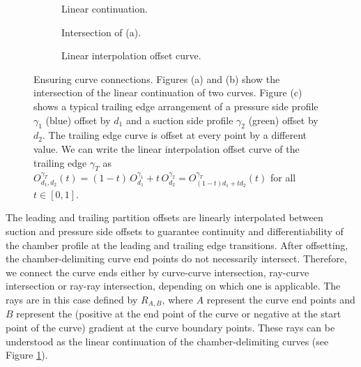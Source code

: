 \documentclass[a4paper, 11pt]{report}
\theoremstyle{definition}
\begin{document}
	\begin{figure}[H]
		\centering
		\begin{subfigure}{0.28\textwidth}
			\centering
			
			\caption{Linear continuation.}
		\end{subfigure}
		\begin{subfigure}{0.28\textwidth}
			\centering
			
			\caption{Intersection of (a).}
		\end{subfigure}
		\begin{subfigure}{0.42\textwidth}
			\centering
			
			\caption{Linear interpolation offset curve.}
		\end{subfigure}
		\caption{Ensuring curve connections. Figures (a) and (b) show the intersection of the linear continuation of two curves. Figure (c) shows a typical trailing edge arrangement of a pressure side profile $\gamma_1$ (blue) offset by $d_1$ and a suction side profile $\gamma_2$ (green) offset by $d_2$. The trailing edge curve is offset at every point by a different value. We can write the linear interpolation offset curve of the trailing edge $\gamma_T$ as $O_{d_1, d_2}^{\gamma_T}(t) = (1-t)\,O_{d_1}^{\gamma_1} + t\,O_{d_2}^{\gamma_2} = O^{\gamma_T}_{(1-t)d_1 + td_2}(t)$ for all $t \in [0,1]$.}
		\label{fig:linear_continuation_curve}
	\end{figure}

	The leading and trailing partition offsets are linearly interpolated between suction and pressure side offsets to guarantee continuity and differentiability of the chamber profile at the leading and trailing edge transitions. After offsetting, the chamber-delimiting curve end points do not necessarily intersect. Therefore, we connect the curve ends either by curve-curve intersection, ray-curve intersection or ray-ray intersection, depending on which one is applicable. The rays are in this case defined by $R_{A,B}$, where $A$ represent the curve end points and $B$ represent the (positive at the end point of the curve or negative at the start point of the curve) gradient at the curve boundary points. These rays can be understood as the linear continuation of the chamber-delimiting curves (see Figure \ref{fig:linear_continuation_curve}).
\end{document}

